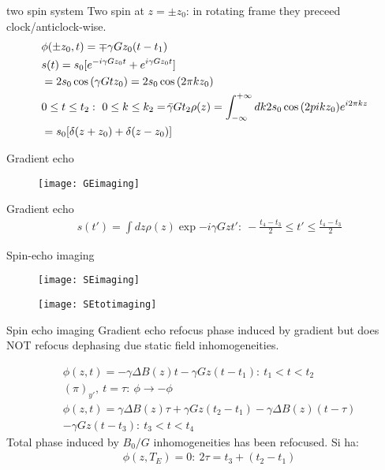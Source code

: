 \begin{frame}{two spin system}
Two spin at $z=\pm z_0$: in rotating frame they preceed clock/anticlock-wise.
\begin{align*}
&\phi(\pm z_0,t)=\mp\gamma Gz_0(t-t_1)\\
&s(t)=s_0[\exp{-i\gamma Gz_0t}+\exp{i\gamma Gz_0t}]\\
&=2s_0\cos{(\gamma G t z_0)}=2s_0\cos{(2\pi kz_0)}\\
&0\leq t\leq t_2:\ 0\leq k\leq k_2=\gammabar Gt_2
\rho(z)=\intsinf{}d k2s_0\cos{(2pi kz_0)}\exp{i2\pi kz}\\
&=s_0[\delta(z+z_0)+\delta(z-z_0)]
\end{align*}

\end{frame}

\begin{frame}{Gradient echo}
\begin{figure}[!ht]\texttt{[image: GEimaging]}\end{figure}

\end{frame}

\begin{wordonframe}{Gradient echo}
\begin{align*}
&s(t')=\int d z\rho(z)\exp{-i\gamma Gzt'}:\ -\frac{t_4-t_3}{2}\leq t'\leq \frac{t_4-t_3}{2}
\end{align*}
\end{wordonframe}

\begin{frame}[allowframebreaks]{Spin-echo imaging}
\begin{figure}[!ht]\texttt{[image: SEimaging]}\end{figure}
\begin{figure}[!ht]\texttt{[image: SEtotimaging]}\end{figure}
\end{frame}

\begin{wordonframe}{Spin echo imaging}
Gradient echo refocus phase induced by gradient but does NOT refocus dephasing due static field inhomogeneities.

\begin{align*}
&\phi(z,t)=-\gamma\Delta B(z)t-\gamma Gz(t-t_1):\ t_1<t<t_2\\
&(\pi)_{y'},\ t=\tau:\ \phi\to-\phi\\
&\phi(z,t)=\gamma\Delta B(z)\tau+\gamma Gz(t_2-t_1)-\gamma\Delta B(z)(t-\tau)\\
&-\gamma Gz(t-t_3):\ t_3<t<t_4
\end{align*}
Total phase induced by $B_0/G$ inhomogeneities has been refocused.
Si ha:
\begin{align*}
&\phi(z,T_E)=0:\ 2\tau=t_3+(t_2-t_1)
\end{align*}
\end{wordonframe}


